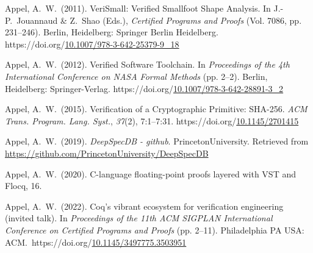 \documentclass[12pt,twoside]{article}
\begin{document}
{\begin{thebibliography}{1079}
\mdbibitemlabel{}Appel, A.~W.~(2011). VeriSmall: Verified Smallfoot Shape Analysis. In J.-P.~Jouannaud \& Z.~Shao (Eds.), \emph{Certified Programs and Proofs} (Vol. 7086, pp. 231–246). Berlin, Heidelberg: Springer Berlin Heidelberg. https://doi.org/\href{https://dx.doi.org/10.1007/978-3-642-25379-9_18}{10.1007/978-3-642-25379-9\_18}%

\mdbibitemlabel{}Appel, A.~W.~(2012). Verified Software Toolchain. In \emph{Proceedings of the 4th International Conference on NASA Formal Methods} (pp. 2–2). Berlin, Heidelberg: Springer-Verlag. https://doi.org/\href{https://dx.doi.org/10.1007/978-3-642-28891-3_2}{10.1007/978-3-642-28891-3\_2}%

\mdbibitemlabel{}Appel, A.~W.~(2015). Verification of a Cryptographic Primitive: SHA-256. \emph{ACM Trans. Program. Lang. Syst.}, \emph{37}(2), 7:1–7:31. https://doi.org/\href{https://dx.doi.org/10.1145/2701415}{10.1145/2701415}%

\mdbibitemlabel{}Appel, A.~W.~(2019). \emph{DeepSpecDB - github}. PrincetonUniversity. Retrieved from \href{https://github.com/PrincetonUniversity/DeepSpecDB}{{\ttfamily https://\hspace{0pt}github.\hspace{0pt}com/\hspace{0pt}PrincetonUniversity/\hspace{0pt}DeepSpecDB}}%

\mdbibitemlabel{}Appel, A.~W.~(2020). C-language ﬂoating-point proofs layered with VST and Flocq, 16.%

\mdbibitemlabel{}Appel, A.~W.~(2022). Coq’s vibrant ecosystem for verification engineering (invited talk). In \emph{Proceedings of the 11th ACM SIGPLAN International Conference on Certified Programs and Proofs} (pp. 2–11). Philadelphia PA USA: ACM.~https://doi.org/\href{https://dx.doi.org/10.1145/3497775.3503951}{10.1145/3497775.3503951}%


\end{thebibliography}}
\end{document}
